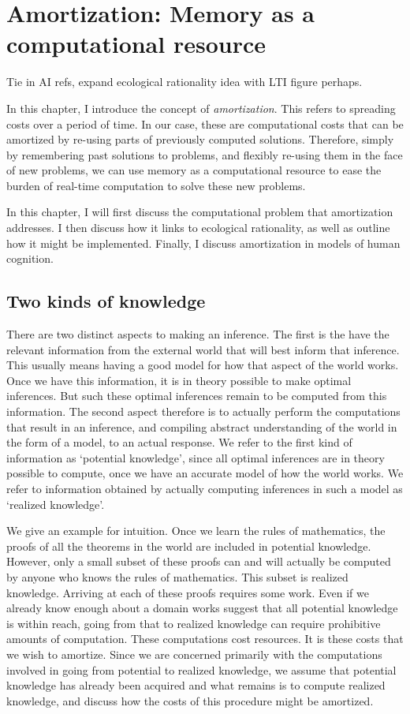 \chapter{Amortization: Memory as a computational resource}
\label{chap:amort}

Tie in AI refs, expand ecological rationality idea with LTI figure perhaps.

In this chapter, I introduce the concept of \textit{amortization}. This refers to spreading costs over a period of time. In our case, these are computational costs that can be amortized by re-using parts of previously computed solutions. Therefore, simply by remembering past solutions to problems, and flexibly re-using them in the face of new problems, we can use memory as a computational resource to ease the burden of real-time computation to solve these new problems. 

In this chapter, I will first discuss the computational problem that amortization addresses. I then discuss how it links to ecological rationality, as well as outline how it might be implemented. Finally, I discuss amortization in models of human cognition.

\section{Two kinds of knowledge}

There are two distinct aspects to making an inference. The first is the have the relevant information from the external world that will best inform that inference. This usually means having a good model for how that aspect of the world works. Once we have this information, it is in theory possible to make optimal inferences. But such these optimal inferences remain to be computed from this information. The second aspect therefore is to actually perform the computations that result in an inference, and compiling abstract understanding of the world in the form of a model, to an actual response. We refer to the first kind of information as `potential knowledge', since all optimal inferences are in theory possible to compute, once we have an accurate model of how the world works. We refer to information obtained by actually computing inferences in such a model as `realized knowledge'. 

We give an example for intuition. Once we learn the rules of mathematics, the proofs of all the theorems in the world are included in potential knowledge. However, only a small subset of these proofs can and will actually be computed by anyone who knows the rules of mathematics. This subset is realized knowledge. Arriving at each of these proofs requires some work. Even if we already know enough about a domain works suggest that all potential knowledge is within reach, going from that to realized knowledge can require prohibitive amounts of computation. These computations cost resources. It is these costs that we wish to amortize. Since we are concerned primarily with the computations involved in going from potential to realized knowledge, we assume that potential knowledge has already been acquired and what remains is to compute realized knowledge, and discuss how the costs of this procedure might be amortized.

